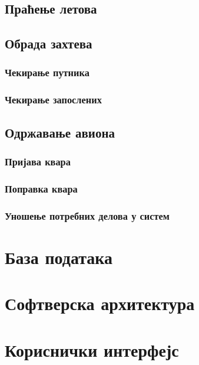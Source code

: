 \documentclass{article}
\begin{document}
\subsection{Праћење летова}

\subsection{Обрада захтева}

\subsubsection{Чекирање путника}

\subsubsection{Чекирање запослених}

\subsection{Одржавање авиона}

\subsubsection{Пријава квара}

\subsubsection{Поправка квара}

\subsubsection{Уношење потребних делова у систем}

\section{База података}

\section{Софтверска архитектура}

\section{Кориснички интерфејс}
\end{document}
